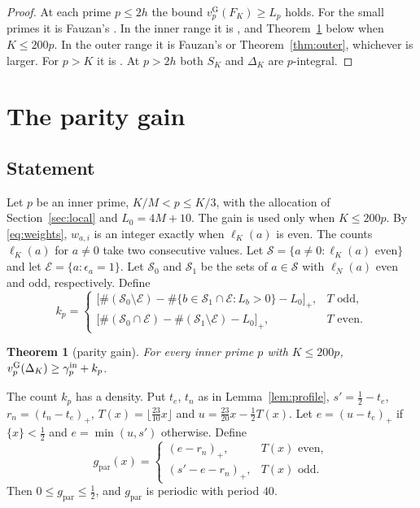 \documentclass[11pt]{amsart}
\newtheorem{theorem}{Theorem}[section]
\theoremstyle{definition}
\theoremstyle{remark}
\numberwithin{equation}{section}
\newcommand{\vG}{v_p^{\mathrm G}}
\newcommand{\fr}[1]{\{#1\}}
\newcommand{\gref}{g_{\mathrm{par}}}
\begin{document}
\begin{proof}
At each prime $p\le2h$ the bound $\vG(F_K)\ge L_p$ holds. For the small primes it is Fauzan's \cite[(3.12)]{Fauzan2026}.
In the inner range it is \cite[Proposition~4.1]{Fauzan2026}, and Theorem~\ref{thm:parity} below when $K\le200p$. In the outer range it is Fauzan's
\cite[Proposition~4.3]{Fauzan2026} or Theorem~\ref{thm:outer}, whichever is larger. For $p>K$ it is
\cite[Proposition~4.3]{Fauzan2026}. At $p>2h$ both $S_K$ and $\Delta_K$ are $p$-integral.
\end{proof}

\section{The parity gain}\label{sec:parity}

\subsection{Statement}
Let $p$ be an inner prime, $K/M<p\le K/3$, with the allocation of Section~\ref{sec:local} and $L_0=4M+10$. The
gain is used only when $K\le200p$. By
\eqref{eq:weights}, $w_{a,i}$ is an integer exactly when $\ell_K(a)$ is even. The counts $\ell_K(a)$ for $a\ne0$ take
two consecutive values. Let $\mathcal S=\{a\ne0:\ell_K(a)\text{ even}\}$ and let $\mathcal E=\{a:\epsilon_a=1\}$. Let $\mathcal S_0$ and $\mathcal S_1$ be the sets of $a\in\mathcal S$ with
$\ell_N(a)$ even and odd, respectively. Define
\[
 k_p=\begin{cases}
 \bigl[\#(\mathcal S_0\setminus\mathcal E)-\#\{b\in\mathcal S_1\cap\mathcal E:L_b>0\}-L_0\bigr]_+ ,& T\text{ odd},\\[2pt]
 \bigl[\#(\mathcal S_0\cap\mathcal E)-\#(\mathcal S_1\setminus\mathcal E)-L_0\bigr]_+ ,& T\text{ even}.
 \end{cases}
\]

\begin{theorem}[parity gain]\label{thm:parity}
For every inner prime $p$ with $K\le200p$, $\vG(\Delta_K)\ge\gamma^{\rm in}_p+k_p$.
\end{theorem}

The count $k_p$ has a density. Put $t_e$, $t_n$ as in Lemma~\ref{lem:profile}, $s'=\frac12-t_e$,
$r_n=(t_n-t_e)_+$, $T(x)=\lfloor\frac{23}{10}x\rfloor$ and $u=\frac{23}{20}x-\frac12T(x)$. Let $e=(u-t_e)_+$ if
$\fr x<\frac12$ and $e=\min(u,s')$ otherwise. Define
\[
 \gref(x)=\begin{cases}(e-r_n)_+, & T(x)\text{ even},\\ (s'-e-r_n)_+, & T(x)\text{ odd}.\end{cases}
\]
Then $0\le\gref\le\frac12$, and $\gref$ is periodic with period $40$.
\end{document}
